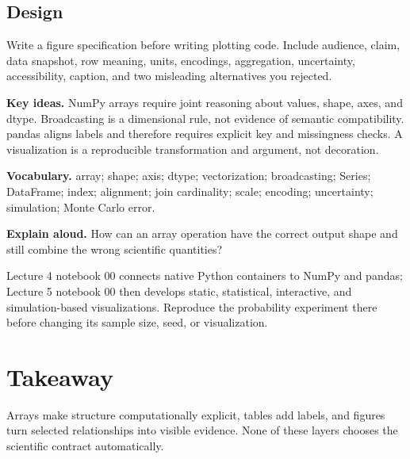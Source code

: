 \subsection*{Design}
Write a figure specification before writing plotting code. Include audience,
claim, data snapshot, row meaning, units, encodings, aggregation, uncertainty,
accessibility, caption, and two misleading alternatives you rejected.

\begin{chapterreview}
\textbf{Key ideas.} NumPy arrays require joint reasoning about values, shape,
axes, and dtype. Broadcasting is a dimensional rule, not evidence of semantic
compatibility. pandas aligns labels and therefore requires explicit key and
missingness checks. A visualization is a reproducible transformation and
argument, not decoration.

\textbf{Vocabulary.} array; shape; axis; dtype; vectorization; broadcasting;
Series; DataFrame; index; alignment; join cardinality; scale; encoding;
uncertainty; simulation; Monte Carlo error.

\textbf{Explain aloud.} How can an array operation have the correct output shape
and still combine the wrong scientific quantities?
\end{chapterreview}

\begin{notebooklink}
Lecture 4 notebook 00 connects native Python containers to NumPy and pandas;
Lecture 5 notebook 00 then develops static, statistical, interactive, and simulation-based
visualizations. Reproduce the probability experiment there before changing its
sample size, seed, or visualization.
\end{notebooklink}

\section{Takeaway}

Arrays make structure computationally explicit, tables add labels, and figures
turn selected relationships into visible evidence. None of these layers chooses
the scientific contract automatically.
